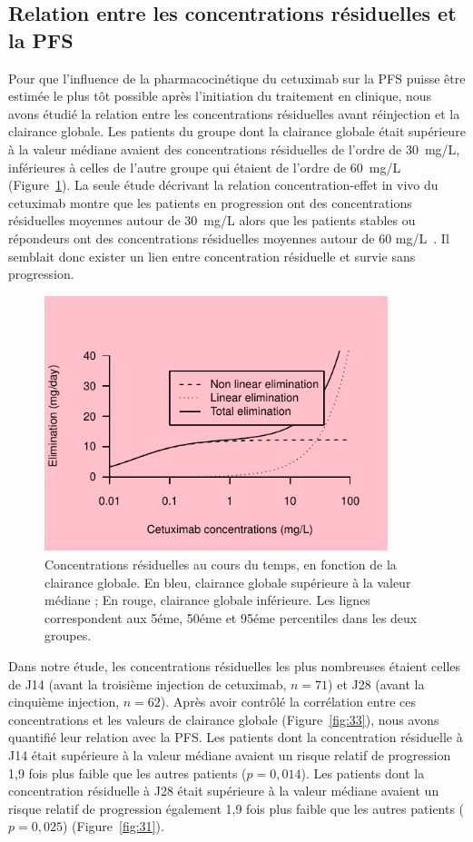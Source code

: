 \subsection{Relation entre les concentrations résiduelles et la PFS}
Pour que l'influence de la pharmacocinétique du cetuximab sur la PFS puisse être estimée le plus tôt possible après l'initiation du traitement en clinique, nous avons étudié la relation entre les concentrations résiduelles avant réinjection et la clairance globale. Les patients du groupe dont la clairance globale était supérieure à la valeur médiane avaient des concentrations résiduelles de l'ordre de 30~mg/L, inférieures à celles de l'autre groupe qui étaient de l'ordre de 60~mg/L (Figure~\ref{fig:29}). La seule étude décrivant la relation concentration-effet in vivo du cetuximab montre que les patients en progression ont des concentrations résiduelles moyennes autour de 30~mg/L alors que les patients stables ou répondeurs ont des concentrations résiduelles moyennes autour de 60 mg/L~\citep{REF122}. Il semblait donc exister un lien entre concentration résiduelle et survie sans progression. 
\begin{figure}[htbp]
	\centering
		\includegraphics[width=10cm]{images/essai001.pdf}
	\caption{Concentrations résiduelles au cours du temps, en fonction de la clairance globale. En bleu, clairance globale supérieure à la valeur médiane ; En rouge, clairance globale inférieure. Les lignes correspondent aux 5éme, 50éme et 95éme percentiles dans les deux groupes.}
	\label{fig:29}
\end{figure}
Dans notre étude, les concentrations résiduelles les plus nombreuses étaient celles de J14 (avant la troisième injection de cetuximab, $n = 71$) et J28 (avant la cinquième injection, $n = 62$). Après avoir contrôlé la corrélation entre ces concentrations et les valeurs de clairance globale (Figure~\ref{fig:33}), nous avons quantifié leur relation  avec la PFS. Les patients dont la concentration résiduelle à J14 était supérieure à la valeur médiane avaient un risque relatif de progression 1,9 fois plus faible que les autres patients ($p = 0,014$). Les patients dont la concentration résiduelle à J28 était supérieure à la valeur médiane avaient un risque relatif de progression également 1,9 fois plus faible que les autres patients ($p = 0,025$) (Figure~\ref{fig:31}).
